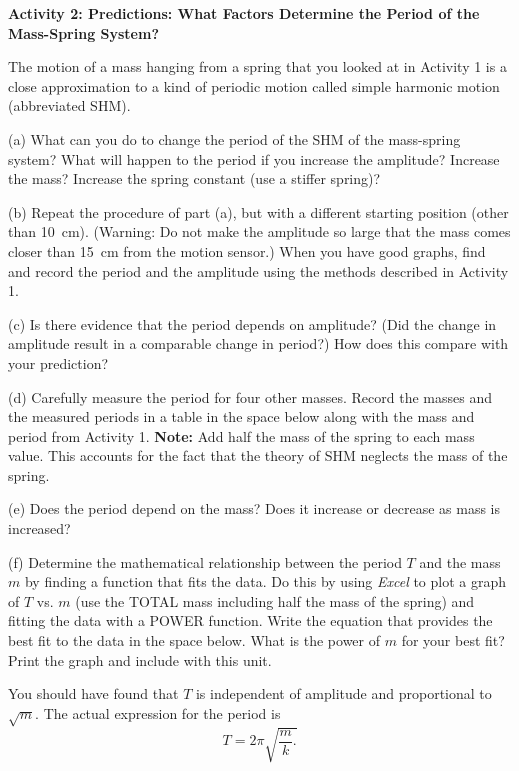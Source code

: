 \bigskip

\textbf{Activity 2: Predictions:  What Factors Determine the Period of the Mass-Spring System? }

The motion of a mass hanging from a spring that you looked at in Activity 1
is a close approximation to a kind of periodic motion called simple harmonic
motion (abbreviated SHM).

(a) What can you do to change the period of the SHM of the mass-spring system? What
will happen to the period if you increase the amplitude? Increase the mass?
Increase the spring constant (use a stiffer spring)?
\answerspace{20mm}

(b) Repeat the procedure of part (a), but with a different starting position
(other than 10~cm). (Warning: Do not make the amplitude so large that the mass
comes closer than 15~cm from the motion sensor.) When you have good graphs,
find and record the period and the amplitude using the methods described in
Activity 1. 
\answerspace{15mm}


(c) Is there evidence that the period depends on amplitude? (Did the change
in amplitude result in a comparable change in period?) How does this
compare with your prediction?
\answerspace{10mm}

\pagebreak[2]
(d) Carefully measure the period for four other masses. Record the masses and
the measured periods in a table in the space below along with the mass and 
period from Activity 1. \textbf{Note:} Add half the mass of the spring to each
mass value. This accounts for the fact that the theory of SHM neglects the mass 
of the spring.
\answerspace{35mm}

(e) Does the period depend on the mass? Does it increase or decrease as mass
is increased?
\answerspace{15mm}

(f) Determine the mathematical relationship between the period $T$ and the mass
$m$ by finding a function that fits the data. Do this by using \textit{Excel} to plot 
a graph of $T$ vs. $m$ (use the TOTAL mass including half the mass of the 
spring) and fitting the data with a POWER function. Write the equation that 
provides the best fit to the data in the space below. What is the power of 
$m$ for your best fit? Print the graph and include with this unit.
\answerspace{20mm}

You should have found that $T$ is independent of amplitude 
and proportional to \( \sqrt{m} \). The actual expression for the period is
\[T=2\pi \sqrt{\frac{m}{k}.}\]


